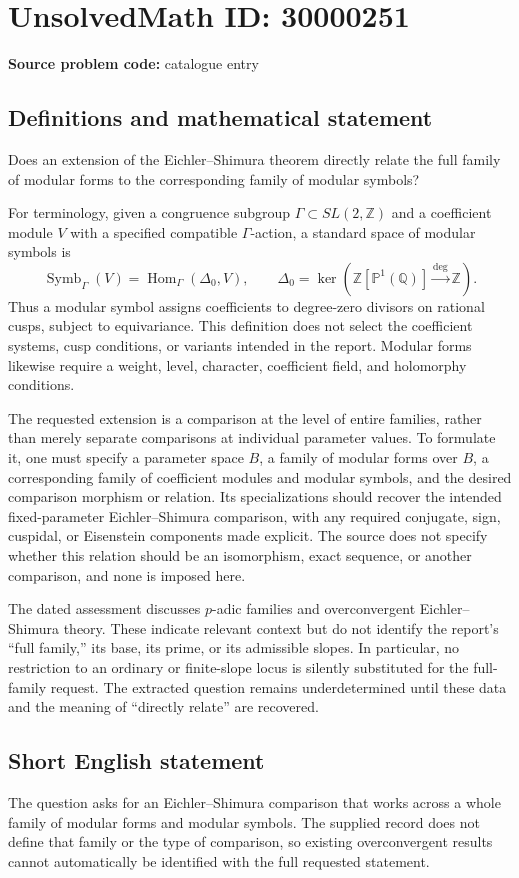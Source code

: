 \documentclass[11pt]{article}
\newcommand{\Z}{\mathbb{Z}}
\newcommand{\Q}{\mathbb{Q}}
\newcommand{\PP}{\mathbb{P}}
\begin{document}
\section*{UnsolvedMath ID: 30000251}
\textbf{Source problem code:} catalogue entry
\subsection{Definitions and mathematical statement}
Does an extension of the Eichler--Shimura theorem directly relate the full family of modular forms to the corresponding family of modular symbols?

For terminology, given a congruence subgroup $\Gamma\subset SL(2,\Z)$ and a coefficient module $V$ with a specified compatible $\Gamma$-action, a standard space of modular symbols is
\[
 \operatorname{Symb}_{\Gamma}(V)
 =\operatorname{Hom}_{\Gamma}(\Delta_0,V),\qquad
 \Delta_0=\ker\!\left(\Z[\PP^1(\Q)]\xrightarrow{\deg}\Z\right).
\]
Thus a modular symbol assigns coefficients to degree-zero divisors on rational cusps, subject to equivariance. This definition does not select the coefficient systems, cusp conditions, or variants intended in the report. Modular forms likewise require a weight, level, character, coefficient field, and holomorphy conditions.

The requested extension is a comparison at the level of entire families, rather than merely separate comparisons at individual parameter values. To formulate it, one must specify a parameter space $B$, a family of modular forms over $B$, a corresponding family of coefficient modules and modular symbols, and the desired comparison morphism or relation. Its specializations should recover the intended fixed-parameter Eichler--Shimura comparison, with any required conjugate, sign, cuspidal, or Eisenstein components made explicit. The source does not specify whether this relation should be an isomorphism, exact sequence, or another comparison, and none is imposed here.

The dated assessment discusses $p$-adic families and overconvergent Eichler--Shimura theory. These indicate relevant context but do not identify the report's ``full family,'' its base, its prime, or its admissible slopes. In particular, no restriction to an ordinary or finite-slope locus is silently substituted for the full-family request. The extracted question remains underdetermined until these data and the meaning of ``directly relate'' are recovered.
\subsection{Short English statement}
The question asks for an Eichler--Shimura comparison that works across a whole family of modular forms and modular symbols. The supplied record does not define that family or the type of comparison, so existing overconvergent results cannot automatically be identified with the full requested statement.
\end{document}
